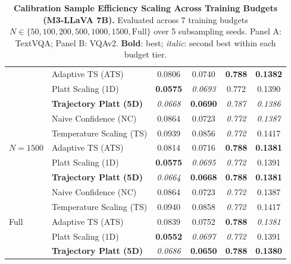 \begin{table}[t]
\begin{tabular}{llcccc}
 & Adaptive TS (ATS) & 0.0806 & 0.0740 & \textbf{0.788} & \textbf{0.1382} \\
 & Platt Scaling (1D) & \textbf{0.0575} & \textit{0.0693} & 0.772 & 0.1390 \\
 & \textbf{Trajectory Platt (5D)} & \textit{0.0668} & \textbf{0.0690} & \textit{0.787} & \textit{0.1386} \\
\midrule
\multirow{5}{*}{$N = 1500$} & Naive Confidence (NC) & 0.0864 & 0.0723 & \textit{0.772} & \textit{0.1387} \\
 & Temperature Scaling (TS) & 0.0939 & 0.0856 & \textit{0.772} & 0.1417 \\
 & Adaptive TS (ATS) & 0.0814 & 0.0716 & \textbf{0.788} & \textbf{0.1381} \\
 & Platt Scaling (1D) & \textbf{0.0575} & \textit{0.0695} & \textit{0.772} & 0.1391 \\
 & \textbf{Trajectory Platt (5D)} & \textit{0.0664} & \textbf{0.0668} & \textbf{0.788} & \textbf{0.1381} \\
\midrule
\multirow{5}{*}{Full} & Naive Confidence (NC) & 0.0864 & 0.0723 & \textit{0.772} & 0.1387 \\
 & Temperature Scaling (TS) & 0.0940 & 0.0858 & \textit{0.772} & 0.1417 \\
 & Adaptive TS (ATS) & 0.0839 & 0.0752 & \textbf{0.788} & \textit{0.1381} \\
 & Platt Scaling (1D) & \textbf{0.0552} & \textit{0.0697} & \textit{0.772} & 0.1391 \\
 & \textbf{Trajectory Platt (5D)} & \textit{0.0686} & \textbf{0.0650} & \textbf{0.788} & \textbf{0.1380} \\
\bottomrule
\end{tabular}
\caption{\textbf{Calibration Sample Efficiency Scaling Across Training Budgets (M3-LLaVA 7B).} Evaluated across 7 training budgets $N \in \{50, 100, 200, 500, 1000, 1500, \text{Full}\}$ over 5 subsampling seeds. Panel A: TextVQA; Panel B: VQAv2. \textbf{Bold}: best; \textit{italic}: second best within each budget tier.}
\label{tab:sample_efficiency_macro_m3}
\end{table}

